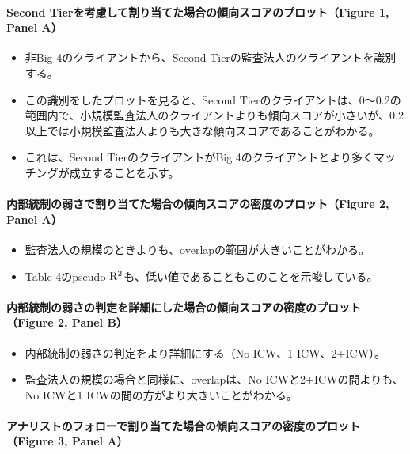 \paragraph{Second Tierを考慮して割り当てた場合の傾向スコアのプロット（Figure 1, Panel A）}

\begin{itemize}
 \item 非Big 4のクライアントから、Second Tierの監査法人のクライアントを識別する。
 \item この識別をしたプロットを見ると、Second Tierのクライアントは、0〜0.2の範囲内で、小規模監査法人のクライアントよりも傾向スコアが小さいが、0.2以上では小規模監査法人よりも大きな傾向スコアであることがわかる。
 \item これは、Second TierのクライアントがBig 4のクライアントとより多くマッチングが成立することを示す。
\end{itemize}

\paragraph{内部統制の弱さで割り当てた場合の傾向スコアの密度のプロット（Figure 2, Panel A）}

\begin{itemize}
 \item 監査法人の規模のときよりも、overlapの範囲が大きいことがわかる。
 \item Table 4のpseudo-${\rm R^2}$も、低い値であることもこのことを示唆している。
\end{itemize}

\paragraph{内部統制の弱さの判定を詳細にした場合の傾向スコアの密度のプロット（Figure 2, Panel B）}

\begin{itemize}
 \item 内部統制の弱さの判定をより詳細にする（No ICW、1 ICW、2+ICW）。
 \item 監査法人の規模の場合と同様に、overlapは、No ICWと2+ICWの間よりも、No ICWと1 ICWの間の方がより大きいことがわかる。
\end{itemize}

\paragraph{アナリストのフォローで割り当てた場合の傾向スコアの密度のプロット（Figure 3, Panel A）}

